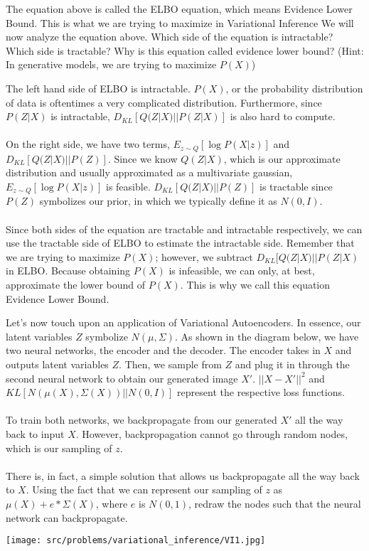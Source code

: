 \begin{Parts}
\begin{solution}
\end{solution}


\Part
The equation above is called the ELBO equation, which means Evidence Lower Bound. This is what we are trying to maximize in Variational Inference We will now analyze the equation above. Which side of the equation is intractable? Which side is tractable? Why is this equation called evidence lower bound? (Hint: In generative models, we are trying to maximize $ P(X) $)

\begin{solution}

The left hand side of ELBO is intractable. $ P(X) $, or the probability distribution of data is oftentimes a very complicated distribution. Furthermore, since $ P(Z|X) $ is intractable, $ D_{KL}[Q(Z|X)||P(Z|X)] $ is also hard to compute.\\\\On the right side, we have two terms, $ E_{z\sim Q}[\log P(X|z)] $ and $ D_{KL}[Q(Z|X)||P(Z)] $. Since we know $ Q(Z|X) $, which is our approximate distribution and usually approximated as a multivariate gaussian, $ E_{z\sim Q}[\log P(X|z)] $ is feasible.  $ D_{KL}[Q(Z|X)||P(Z)] $ is tractable since $ P(Z) $ symbolizes our prior, in which we typically define it as $ N(0, I) $.\\\\Since both sides of the equation are tractable and intractable respectively, we can use the tractable side of ELBO to estimate the intractable side. Remember that we are trying to maximize $ P(X) $; however, we subtract $ D_{KL}[Q(Z|X)||P(Z|X) $ in ELBO. Because obtaining $ P(X) $ is infeasible, we can only, at best, approximate the lower bound of $ P(X) $. This is why we call this equation Evidence Lower Bound.


\end{solution}

\Part
Let's now touch upon an application of Variational Autoencoders. In essence, our latent variables $ Z $ symbolize $ N(\mu, \Sigma)$. As shown in the diagram below, we have two neural networks, the encoder and the decoder. The encoder takes in $ X $ and outputs latent variables $ Z $. Then, we sample from $ Z $ and plug it in through the second neural network to obtain our generated image $ X' $. $ ||X - X'||^2 $ and $ KL[N(\mu(X), \Sigma(X))|| N(0, I)] $ represent the respective loss functions.\\\\To train both networks, we backpropagate from our generated $ X' $ all the way back to input $ X $. However, backpropagation cannot go through random nodes, which is our sampling of $ z $.\\\\There is, in fact, a simple solution that allows us backpropagate all the way back to $ X $. Using the fact that we can represent our sampling of $ z $ as $ \mu(X) + e*\Sigma(X) $, where $ e $ is $ N(0, 1) $, redraw the nodes such that the neural network can backpropagate.
\begin{center}
\texttt{[image: src/problems/variational\_inference/VI1.jpg]}
\end{center}


\end{Parts}
